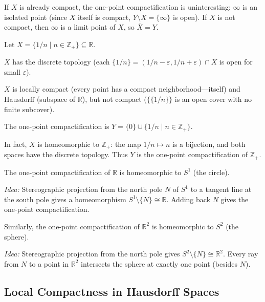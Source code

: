 \documentclass[11pt]{report}
\begin{document}
\begin{rembox}
If $X$ is already compact, the one-point compactification is uninteresting: $\infty$ is an isolated point (since $X$ itself is compact, $Y \setminus X = \{\infty\}$ is open). If $X$ is not compact, then $\infty$ is a limit point of $X$, so $\overline{X} = Y$.
\end{rembox}

\begin{exbox}
Let $X = \{1/n \mid n \in \mathbb{Z}_+\} \subseteq \mathbb{R}$.

$X$ has the discrete topology (each $\{1/n\} = (1/n - \varepsilon, 1/n + \varepsilon) \cap X$ is open for small $\varepsilon$).

$X$ is locally compact (every point has a compact neighborhood---itself) and Hausdorff (subspace of $\mathbb{R}$), but not compact ($\{\{1/n\}\}$ is an open cover with no finite subcover).

The one-point compactification is $Y = \{0\} \cup \{1/n \mid n \in \mathbb{Z}_+\}$.

In fact, $X$ is homeomorphic to $\mathbb{Z}_+$: the map $1/n \mapsto n$ is a bijection, and both spaces have the discrete topology. Thus $Y$ is the one-point compactification of $\mathbb{Z}_+$.
\end{exbox}

\begin{exbox}
The one-point compactification of $\mathbb{R}$ is homeomorphic to $S^1$ (the circle).

\textit{Idea:} Stereographic projection from the north pole $N$ of $S^1$ to a tangent line at the south pole gives a homeomorphism $S^1 \setminus \{N\} \cong \mathbb{R}$. Adding back $N$ gives the one-point compactification.

Similarly, the one-point compactification of $\mathbb{R}^2$ is homeomorphic to $S^2$ (the sphere).

\textit{Idea:} Stereographic projection from the north pole gives $S^2 \setminus \{N\} \cong \mathbb{R}^2$. Every ray from $N$ to a point in $\mathbb{R}^2$ intersects the sphere at exactly one point (besides $N$).
\end{exbox}

\subsection{Local Compactness in Hausdorff Spaces}
\end{document}
